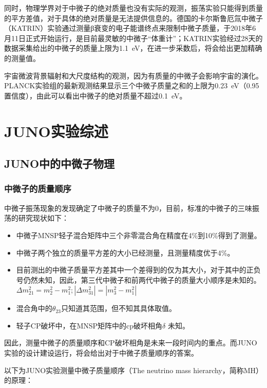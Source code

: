 \documentclass[10pt,a4paper]{article}
\begin{document}
同时，物理学界对于中微子的绝对质量也没有实际的观测，振荡实验只能得到质量的平方差值，对于具体的绝对质量是无法提供信息的。德国的卡尔斯鲁厄氚中微子（KATRIN）实验通过测量β衰变的电子能谱终点来限制中微子质量，于2018年6月11日正式开始运行，是目前最灵敏的中微子“体重计”；KATRIN实验经过28天的数据采集给出的中微子的质量上限为\SI{1.1}{eV}，在进一步采数后，将会给出更加精确的测量值。

宇宙微波背景辐射和大尺度结构的观测，因为有质量的中微子会影响宇宙的演化。PLANCK实验组的最新观测结果显示三个中微子质量之和的上限为\SI{0.23}{eV}（0.95置信度），由此可以看出中微子的绝对质量不超过\SI{0.1}{eV}。

\newpage
\section{JUNO实验综述} \label{sysdes}%

\subsection{JUNO中的中微子物理}\label{sub:sysover}
\subsubsection{中微子的质量顺序}\label{sub:sysover}

中微子振荡现象的发现确定了中微子的质量不为0，目前，标准的中微子的三味振荡的研究现状如下\cite{An:2015jdp}：
\begin{itemize}
	\item{中微子MNSP轻子混合矩阵中三个非零混合角在精度在4\%到10\%得到了测量。}
    \item{中微子两个独立的质量平方差的大小已经测量，且测量精度优于4\%。}
    \item{目前测出的中微子质量平方差其中一个差得到的仅为其大小，对于其中的正负号仍然未知，因此，第三代中微子和前两代中微子的质量大小顺序是未知的。$\Delta m_{21}^2=m_{2}^2-m_{1}^2;|\Delta m_{31}^2|=|m_{3}^2-m_{1}^2|$}
    \item{混合角中的$\theta_{23}$只知道其范围，但不知其具体取值。}
    \item{轻子CP破坏中，在MNSP矩阵中的cp破坏相角$\delta$ 未知。}
\end{itemize}

因此，测量中微子的质量顺序和CP破坏相角是未来一段时间内的重点。而JUNO实验的设计建设运行，将会给出对于中微子质量顺序的答案。

以下为JUNO实验测量中微子质量顺序（The neutrino mass hierarchy，简称MH）的原理\cite{An:2015jdp}：
\end{document}
